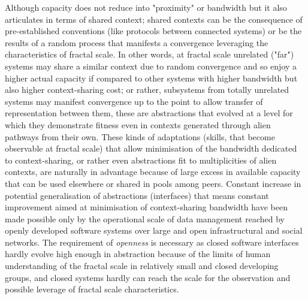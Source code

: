 \documentclass[14pt,a4paper]{extarticle}
\begin{document}
Although capacity does not reduce into "proximity" or bandwidth but it also articulates in terms of shared context; shared contexts can be the consequence of pre-established conventions (like protocols between connected systems) or be the results of a random process that manifests a convergence leveraging the characteristics of fractal scale. In other words, at fractal scale unrelated ("far") systems may share a similar context due to random convergence and so enjoy a higher actual capacity if compared to other systems with higher bandwidth but also higher context-sharing cost; or rather, subsystems from totally unrelated systems may manifest convergence up to the point to allow transfer of representation between them, these are abstractions that evolved at a level for which they demonstrate fitness even in contexts generated through alien pathways from their own. These kinds of adaptations (skills, that become observable at fractal scale) that allow minimisation of the bandwidth dedicated to context-sharing, or rather even abstractions fit to multiplicities of alien contexts, are naturally in advantage because of large excess in available capacity that can be used elsewhere or shared in pools among peers. Constant increase in potential generalisation of abstractions (interfaces) that means constant improvement aimed at minimisation of context-sharing bandwidth have been made possible only by the operational scale of data management reached by openly developed software systems over large and open infrastructural and social networks. The requirement of \textit{openness} is necessary as closed software interfaces hardly evolve high enough in abstraction because of the limits of human understanding of the fractal scale in relatively small and closed developing groups, and closed systems hardly can reach the scale for the observation and possible leverage of fractal scale characteristics.  

\newpage

\end{document}
